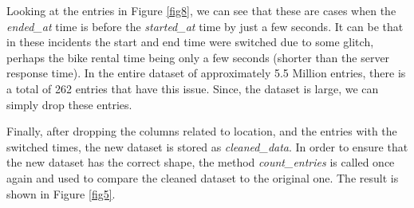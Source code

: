 \documentclass[12pt]{article}
\begin{document}
\begin{itemize}
Looking at the entries in Figure \ref{fig8}, we can see that these are cases when the \textit{ended\_at} time is before the \textit{started\_at} time by just a few seconds. It can be that in these incidents the start and end time were switched due to some glitch, perhaps the bike rental time being only a few seconds (shorter than the server response time). In the entire dataset of approximately 5.5 Million entries, there is a total of 262 entries that have this issue. Since, the dataset is large, we can simply drop these entries.


Finally, after dropping the columns related to location, and the entries with the switched times, the new dataset is stored as \textit{cleaned\_data}. In order to ensure that the new dataset has the correct shape, the method \textit{count\_entries} is called once again and used to compare the cleaned dataset to the original one. The result is shown in Figure \ref{fig5}.
	

\end{itemize}
\end{document}
